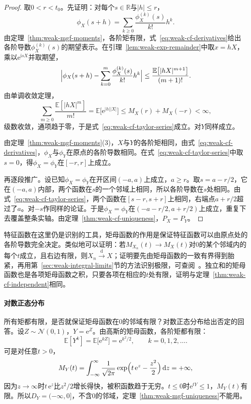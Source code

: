 \begin{proof}
取$0<r<t_0$。先证明：对每个$s\in\mathbb{R}$与$\lvert h\rvert\leq r$，
\begin{equation}
 \phi_X(s+h)=\sum_{k\geq0}\frac{\phi_X^{(k)}(s)}{k!}h^{k} .
 \label{eq:weak-cf-taylor-series}
\end{equation}
由定理~\ref{thm:weak-mgf-moments}，各阶矩有限，式~\eqref{eq:weak-cf-derivatives}给出各阶导数$\phi_X^{(k)}(s)$的期望表示。在引理~\ref{lem:weak-exp-remainder}中取$x=hX$，乘以$\mathrm{e}^{\mathrm{i}sX}$并取期望，
\[
 \Bigl\lvert\phi_X(s+h)-\sum_{k=0}^{m}\frac{\phi_X^{(k)}(s)}{k!}h^{k}\Bigr\rvert\leq\frac{\mathbb{E}\bigl[\lvert hX\rvert^{m+1}\bigr]}{(m+1)!} .
\]
由单调收敛定理，
\[
 \sum_{m\geq0}\frac{\mathbb{E}[\lvert hX\rvert^{m}]}{m!}=\mathbb{E}\bigl[\mathrm{e}^{\lvert h\rvert\lvert X\rvert}\bigr]\leq M_X(r)+M_X(-r)<\infty ,
\]
级数收敛，通项趋于零，于是式~\eqref{eq:weak-cf-taylor-series}成立。对$Y$同样成立。

由定理~\ref{thm:weak-mgf-moments}(3)，$X$与$Y$的各阶矩相同，由式~\eqref{eq:weak-cf-derivatives}，$\phi_X$与$\phi_Y$在原点的各阶导数相同。在式~\eqref{eq:weak-cf-taylor-series}中取$s=0$，得$\phi_X=\phi_Y$在$[-r,r]$上成立。

再逐段推广。设已知$\phi_X=\phi_Y$在开区间$(-a,a)$上成立，$a\geq r$。取$s=a-r/2$，它在$(-a,a)$内部，两个函数在$s$的一个邻域上相同，所以各阶导数在$s$处相同。由式~\eqref{eq:weak-cf-taylor-series}，两个函数在$[s-r,s+r]$上相同，右端点$a+r/2$超过了$a$。对$-s$作同样的论证。于是$\phi_X=\phi_Y$在$(-a-r/2,a+r/2)$上成立，重复下去覆盖整条实轴。由定理~\ref{thm:weak-cf-uniqueness}，$P_X=P_Y$。
\end{proof}

特征函数在这里仍是识别的工具，矩母函数的作用是保证特征函数可以由原点处的各阶导数完全决定。类似地可以证明：若$M_{X_n}(t)\to M_X(t)$对$0$的某个邻域内的每个$t$成立，且右边有限，则$X_n\xrightarrow{\mathrm{d}}X$；证明要先由矩母函数的一致有界得到胎紧，再用第~\ref{sec:weak-integral-limits}节的方法识别极限，可查阅~。独立和的矩母函数也是各项矩母函数之积，只要各项在相应的$t$处有限，证明与定理~\ref{thm:weak-cf-independent}相同。

\paragraph{对数正态分布}
所有矩都有限，是否就保证矩母函数在$0$的邻域有限？对数正态分布给出否定的回答。设$Z\sim\mathcal{N}(0,1)$，$Y=\mathrm{e}^{Z}$。由高斯的矩母函数，各阶矩都有限：
\[
 \mathbb{E}[Y^{k}]=\mathbb{E}\bigl[\mathrm{e}^{kZ}\bigr]=\mathrm{e}^{k^{2}/2},\qquad k=0,1,2,\dots .
\]
可是对任意$t>0$，
\[
 M_Y(t)=\int_{-\infty}^{\infty}\frac{1}{\sqrt{2\pi}}\exp\Bigl(t\,\mathrm{e}^{z}-\frac{z^{2}}{2}\Bigr)\,\mathrm{d}z=+\infty ,
\]
因为$z\to\infty$时$t\,\mathrm{e}^{z}$比$z^{2}/2$增长得快，被积函数趋于无穷。$t\leq0$时$\mathrm{e}^{tY}\leq1$，$M_Y(t)$有限。所以$D_Y=(-\infty,0]$，不含$0$的邻域，定理~\ref{thm:weak-mgf-uniqueness}不能用。

